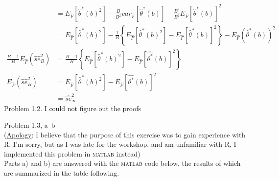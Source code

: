 \documentclass[10pt]{article}
\begin{document}
\begin{align*}
&=
E_{\hat{F}}
	\left[
		\hat{\theta}^*(b)^2
	\right]
-
	\frac{B}{B^2}var_{\hat{F}}
		\left[
			\hat{\theta}^*(b)
		\right]
-
\frac{B^2}{B^2}E_{\hat{F}}
	\left[
		\hat{\theta}^*(b)
	\right]^2\\
&=
E_{\hat{F}}
	\left[
		\hat{\theta}^*(b)^2
	\right]
-\frac{1}{B}
	\left\lbrace
		E_{\hat{F}}
			\left[
				\hat{\theta}^*(b)^2
			\right]
		-E_{\hat{F}}
			\left[
				\hat{\theta}^*(b)
			\right]^2
	\right\rbrace
-
E_{\hat{F}}
	\left(
		\hat{\theta}^*(b)
	\right)^2\\
\frac{B-1}{B}E_{\widehat{F}}
	\left(
		\widehat{se}_B^2
	\right)
&=
\frac{B-1}{B}
	\left\lbrace
		E_{\hat{F}}
			\left[
				\hat{\theta}^*(b)^2
			\right]
		-E_{\widehat{F}}
			\left[
				\hat{\theta^*}(b)
			\right]^2
	\right\rbrace\\
E_{\widehat{F}}
	\left(
		\widehat{se}_B^2
	\right)
&=
E_{\hat{F}}
	\left[
		\hat{\theta}^*(b)^2
	\right]
-E_{\widehat{F}}
	\left[
		\hat{\theta^*}(b)
	\right]^2\\
&=
\widehat{se}_{\infty}^2
\end{align*}
\clearpage
Problem 1.2. I could not figure out the proofs\\
\smallskip

Problem 1.3, a--b\\

(\underline{Apology}: I believe that the purpose of this exercise was to gain experience with R. I'm sorry, but as I was late for the workshop, and am unfamiliar with R, I implemented this problem in \textsc{matlab} instead)\\
Parts a) and b) are answered with the \textsc{matlab} code below, the results of which are summarized in the table following.\\

\end{document}
